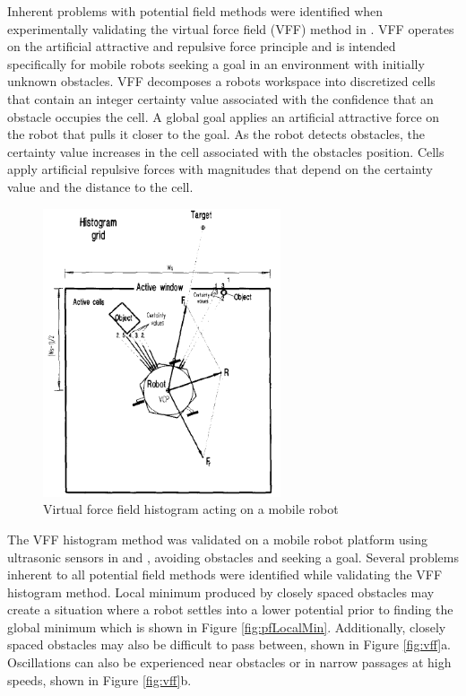 \documentclass[numbered,pdftex]{ohio-etd}
\begin{document}
Inherent problems with potential field methods were identified when experimentally validating the virtual force field (VFF) method in \cite{koren_potential_1991}. VFF operates on the artificial  attractive and repulsive force principle and is intended specifically for mobile robots seeking a goal in an environment with initially unknown obstacles. VFF decomposes a robots workspace into discretized cells that contain an integer certainty value associated with the confidence that an obstacle occupies the cell. A global goal applies an artificial attractive force on the robot that pulls it closer to the goal. As the robot detects obstacles, the certainty value increases in the cell associated with the obstacles position. Cells apply artificial repulsive forces with magnitudes that depend on the certainty value and the distance to the cell.


\begin{figure}[H]
	\centering
	\includegraphics[width=7cm]{PaperFigures/histogram}
	\caption{Virtual force field histogram acting on a mobile robot}
	\label{fig:histogram}
\end{figure}

The VFF histogram method was validated on a mobile robot platform using ultrasonic sensors in \cite{borenstein_real-time_1990} and \cite{borenstein_vector_1991}, avoiding obstacles and seeking a goal. Several problems inherent to all potential field methods were identified while validating the VFF histogram method.  Local minimum produced by closely spaced obstacles may create a situation where a robot settles into a lower potential prior to finding the global minimum which is shown in Figure \ref{fig:pfLocalMin}. Additionally, closely spaced obstacles may also be difficult to pass between, shown in Figure \ref{fig:vff}a. Oscillations can also be experienced near obstacles or in narrow passages at high speeds, shown in Figure \ref{fig:vff}b. 
\end{document}
